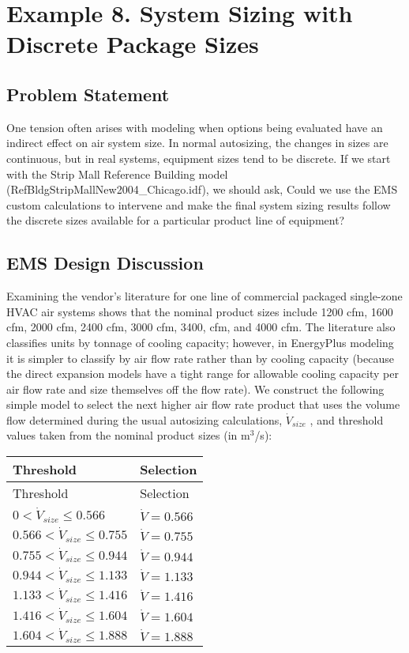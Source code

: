 \section{Example 8. System Sizing with Discrete Package Sizes}\label{example-8.-system-sizing-with-discrete-package-sizes}

\subsection{Problem Statement}\label{problem-statement-010}

One tension often arises with modeling when options being evaluated have an indirect effect on air system size. In normal autosizing, the changes in sizes are continuous, but in real systems, equipment sizes tend to be discrete. If we start with the Strip Mall Reference Building model (RefBldgStripMallNew2004\_Chicago.idf), we should ask, Could we use the EMS custom calculations to intervene and make the final system sizing results follow the discrete sizes available for a particular product line of equipment?

\subsection{EMS Design Discussion}\label{ems-design-discussion-010}

Examining the vendor's literature for one line of commercial packaged single-zone HVAC air systems shows that the nominal product sizes include 1200 cfm, 1600 cfm, 2000 cfm, 2400 cfm, 3000 cfm, 3400, cfm, and 4000 cfm. The literature also classifies units by tonnage of cooling capacity; however, in EnergyPlus modeling it is simpler to classify by air flow rate rather than by cooling capacity (because the direct expansion models have a tight range for allowable cooling capacity per air flow rate and size themselves off the flow rate). We construct the following simple model to select the next higher air flow rate product that uses the volume flow determined during the usual autosizing calculations, \(\dot{V}_{size}\) , and threshold values taken from the nominal product sizes (in m\(^{3}\)/s):

\begin{longtable}[c]{p{4.03in}p{1.96in}}
\toprule 
Threshold & Selection \tabularnewline
\midrule
\endfirsthead

\toprule 
Threshold & Selection \tabularnewline
\midrule
\endhead
$0  <  \dot{V}_{size} \leq 0.566$ & $\dot{V} = 0.566$ \tabularnewline
$0.566  <  \dot{V}_{size} \leq 0.755$ & $\dot{V} = 0.755$ \tabularnewline
$0.755  <  \dot{V}_{size} \leq 0.944$ & $\dot{V} = 0.944$ \tabularnewline
$0.944  <  \dot{V}_{size} \leq 1.133$ & $\dot{V} = 1.133$ \tabularnewline
$1.133  <  \dot{V}_{size} \leq 1.416$ & $\dot{V} = 1.416$ \tabularnewline
$1.416  <  \dot{V}_{size} \leq 1.604$ & $\dot{V} = 1.604$ \tabularnewline
$1.604  <  \dot{V}_{size} \leq 1.888$ & $\dot{V} = 1.888$ \tabularnewline
\bottomrule
\end{longtable}

